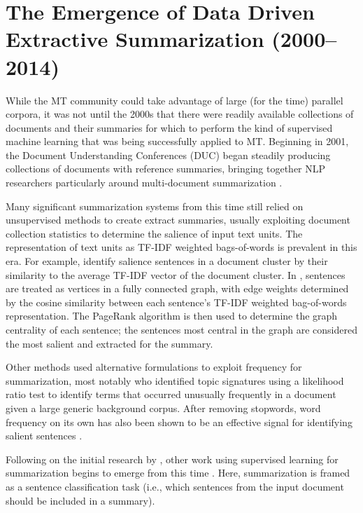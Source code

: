 \section{The Emergence of Data Driven Extractive Summarization (2000--2014)}

While the MT community could take advantage of large (for the time) parallel
corpora,  it was not until the 2000s that there were readily available
collections of documents and their summaries for which to perform the kind of
supervised machine learning that was being successfully applied to MT.
Beginning in 2001, the Document Understanding Conferences (DUC) began steadily
producing collections of documents with reference summaries, bringing together
NLP researchers particularly around multi-document summarization
\citep{jones1999,harman2001,nenkova2005b}.
  
Many significant summarization systems from this time still relied on
unsupervised methods to create extract summaries, usually exploiting document
collection statistics to determine the salience of input text units.  The
representation of text units as TF-IDF weighted bags-of-words \citep{jones1972}
is prevalent in this era. For example, \cite{radev2000} identify salience
sentences in a document cluster by their similarity to the average TF-IDF
vector of the document cluster. In \cite{erkan2004}, sentences are treated as
vertices in a fully connected graph, with edge weights determined by the cosine
similarity between each sentence's TF-IDF weighted bag-of-words representation.
The PageRank algorithm \citep{page1999} is then used to determine the graph
centrality of each sentence; the sentences most central in the graph are
considered the most salient and extracted for the summary. 

Other methods used alternative formulations to exploit frequency for
summarization, most notably \cite{lin2000} who identified topic signatures
using a likelihood ratio test \citep{dunning1993} to identify terms that
occurred unusually frequently in a document given a large generic background
corpus. After removing stopwords, word frequency on its own has also been shown
to be an effective signal for identifying salient sentences
\citep{nenkova2005}.

Following on the initial research by \cite{kupiec1995trainable}, other work
using supervised learning for summarization begins to emerge from this time
\citep{conroy2001,osborne2002using,hirao2002extracting,sipos2012large}.  Here,
summarization is framed as a sentence classification task (i.e., which
sentences from the input document should be included in a summary). 


